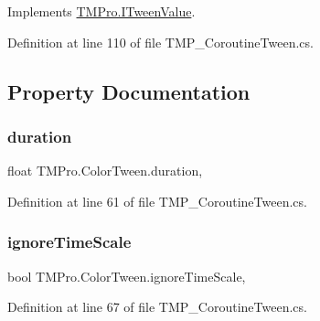 Implements \mbox{\hyperlink{interface_t_m_pro_1_1_i_tween_value_ae0e763108b1d0fe8f9e34661a16fa994}{T\+M\+Pro.\+I\+Tween\+Value}}.



Definition at line 110 of file T\+M\+P\+\_\+\+Coroutine\+Tween.\+cs.



\subsection{Property Documentation}
\mbox{\label{struct_t_m_pro_1_1_color_tween_aa20e0c9773e9a8e50d0feae7c4e599a0}} 
\subsubsection{\texorpdfstring{duration}{duration}}
{\footnotesize\ttfamily float T\+M\+Pro.\+Color\+Tween.\+duration\hspace{0.3cm}{\ttfamily [get]}, {\ttfamily [set]}}



Definition at line 61 of file T\+M\+P\+\_\+\+Coroutine\+Tween.\+cs.

\mbox{\label{struct_t_m_pro_1_1_color_tween_ad8ec0ae32214f07d8e7538636bdbdb08}} 
\subsubsection{\texorpdfstring{ignoreTimeScale}{ignoreTimeScale}}
{\footnotesize\ttfamily bool T\+M\+Pro.\+Color\+Tween.\+ignore\+Time\+Scale\hspace{0.3cm}{\ttfamily [get]}, {\ttfamily [set]}}



Definition at line 67 of file T\+M\+P\+\_\+\+Coroutine\+Tween.\+cs.

\mbox{\label{struct_t_m_pro_1_1_color_tween_a22d5f15683397db24c9fa7ba47e32a11}} 
